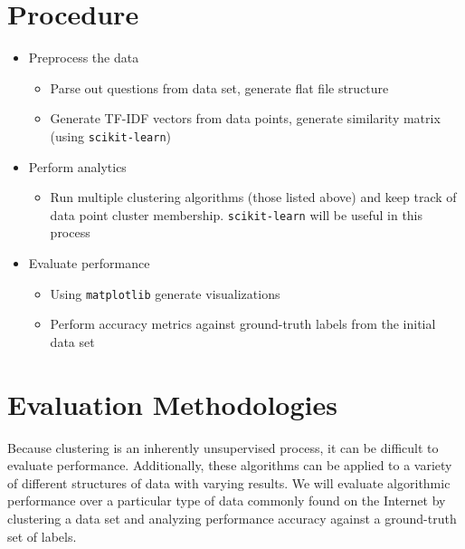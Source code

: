 \documentclass[letterpaper,10pt]{article}
\begin{document}
\section{Procedure}

\begin{itemize}
  \item Preprocess the data
    \begin{itemize}
    \item Parse out questions from data set, generate flat file structure
    \item Generate TF-IDF vectors from data points, generate similarity
    matrix (using \texttt{scikit-learn})
    \end{itemize}
  \item Perform analytics
    \begin{itemize}
    \item Run multiple clustering algorithms (those listed above) and keep
    track of data point cluster membership. \texttt{scikit-learn} will be
    useful in this process
    \end{itemize}
  \item Evaluate performance
    \begin{itemize}
    \item Using \texttt{matplotlib} generate visualizations
    \item Perform accuracy metrics against ground-truth labels from the
    initial data set
    \end{itemize}
\end{itemize}

\section{Evaluation Methodologies}

Because clustering is an inherently unsupervised process, it can be
difficult to evaluate performance. Additionally, these algorithms can be
applied to a variety of different structures of data with varying results.
We will evaluate algorithmic performance over a particular type of data
commonly found on the Internet by clustering a data set and analyzing
performance accuracy against a ground-truth set of labels.

\nocite{*}



\end{document}
